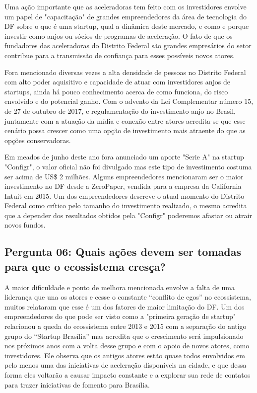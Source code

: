 Uma ação importante que as aceleradoras tem feito com os investidores envolve um papel de "capacitação" de grandes empreendedores da área de tecnologia do DF sobre o que é uma startup, qual a dinâmica deste mercado, e como e porque investir como anjos ou sócios de programas de aceleração. O fato de que os fundadores das aceleradoras do Distrito Federal são grandes empresários do setor contribue para a transmissão de confiança para esses possíveis novos atores. 

Fora mencionado diversas vezes a alta densidade de pessoas no Distrito Federal com alto poder aquisitivo e capacidade de atuar com investidores anjos de startups, ainda há pouco conhecimento acerca de como funciona, do risco envolvido e do potencial ganho. Com o advento da Lei Complementar número 15, de 27 de outubro de 2017, e regulamentação do investimento anjo no Brasil, juntamente com a atuação da mídia e conexão entre atores acredita-se que esse cenário possa crescer como uma opção de investimento mais atraente do que as opções conservadoras.

Em meados de junho deste ano fora anunciado um aporte "Serie A" na startup "Configr", o valor oficial não foi divulgado mas este tipo de investimento costuma ser acima de US\$ 2 milhões. Alguns empreendedores mencionaram ser o maior investimento no DF desde a ZeroPaper, vendida para a empresa da California Intuit em 2015. Um dos empreendedores descreve o atual momento do Distrito Federal como crítico pelo tamanho do investimento realizado, o mesmo acredita que a depender dos resultados obtidos pela "Configr" poderemos afastar ou atrair novos fundos.

\subsection*{Pergunta 06: Quais ações devem ser tomadas para que o ecossistema cresça?}
\label{subsection:pergunta_de_pesquisa_6}

A maior dificuldade e ponto de melhora mencionada envolve a falta de uma liderança que una os atores e cesse o constante ``conflito de egos'' no ecossistema, muitos relataram que esse é um dos fatores de maior limitação do DF. Um dos empreendedores do que pode ser visto como a "primeira geração de startup" relacionou a queda do ecossistema entre 2013 e 2015 com a separação do antigo grupo do ``Startup Brasília'' mas acredita que o crescimento será impulsionado nos próximos anos com a volta desse grupo e com o apoio de novos atores, como investidores. Ele observa que os antigos atores estão quase todos envolvidos em pelo menos uma das iniciativas de aceleração disponíveis na cidade, e que dessa forma eles voltarão a causar impacto constante e a explorar sua rede de contatos para trazer iniciativas de fomento para Brasília.  

